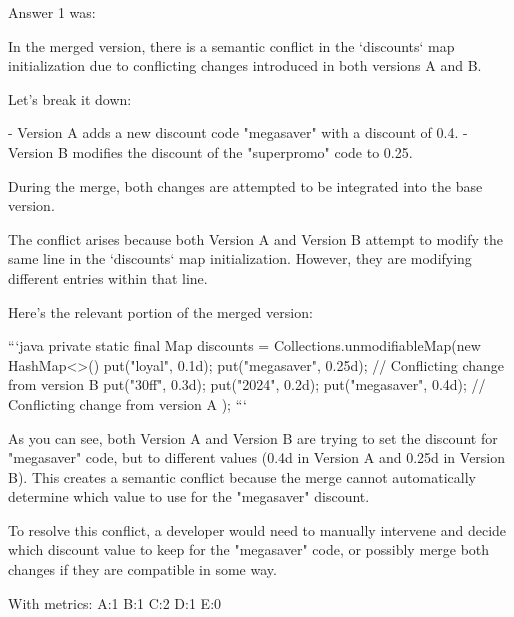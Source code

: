 Answer 1 was:
\begin{spverbatim}
In the merged version, there is a semantic conflict in the `discounts` map initialization due to conflicting changes introduced in both versions A and B.

Let's break it down:

- Version A adds a new discount code "megasaver" with a discount of 0.4.
- Version B modifies the discount of the "superpromo" code to 0.25.

During the merge, both changes are attempted to be integrated into the base version.

The conflict arises because both Version A and Version B attempt to modify the same line in the `discounts` map initialization. However, they are modifying different entries within that line.

Here's the relevant portion of the merged version:

```java
private static final Map discounts = Collections.unmodifiableMap(new HashMap<>() {{
    put("loyal", 0.1d);
    put("megasaver", 0.25d); // Conflicting change from version B
    put("30ff", 0.3d);
    put("2024", 0.2d);
    put("megasaver", 0.4d); // Conflicting change from version A
}});
```

As you can see, both Version A and Version B are trying to set the discount for "megasaver" code, but to different values (0.4d in Version A and 0.25d in Version B). This creates a semantic conflict because the merge cannot automatically determine which value to use for the "megasaver" discount.

To resolve this conflict, a developer would need to manually intervene and decide which discount value to keep for the "megasaver" code, or possibly merge both changes if they are compatible in some way.
\end{spverbatim}

With metrics:
A:1
B:1
C:2
D:1
E:0

